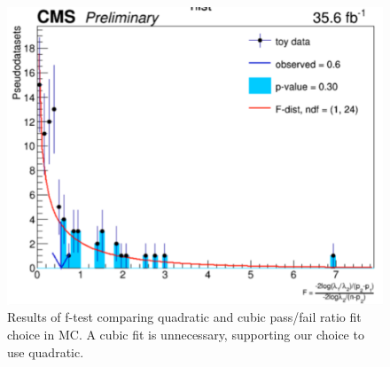 \begin{figure}[thb!]
\begin{center}
\includegraphics[scale=0.25]{Figures/ftestMC.pdf}
\end{center}
\caption{Results of f-test comparing quadratic and cubic pass/fail ratio fit choice in MC. A cubic fit is unnecessary, supporting our choice to use quadratic.}
\label{fig:ftestMC}
\end{figure}



